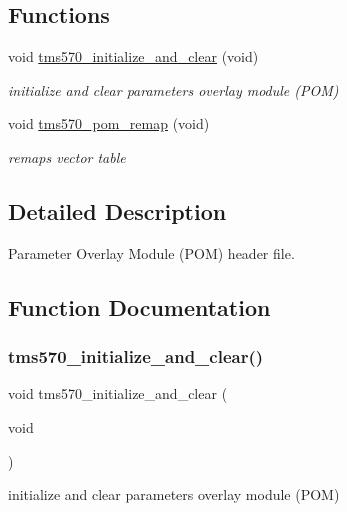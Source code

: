 \subsection*{Functions}
\begin{DoxyCompactItemize}
\item 
void \mbox{\hyperlink{tms570-pom_8h_a910d08b5bfffed83b88de9eb2ab27bc5}{tms570\+\_\+initialize\+\_\+and\+\_\+clear}} (void)
\begin{DoxyCompactList}\small\item\em initialize and clear parameters overlay module (P\+OM) \end{DoxyCompactList}\item 
void \mbox{\hyperlink{tms570-pom_8h_aa5484712012d1e84f9422450a76fd6d4}{tms570\+\_\+pom\+\_\+remap}} (void)
\begin{DoxyCompactList}\small\item\em remaps vector table \end{DoxyCompactList}\end{DoxyCompactItemize}


\subsection{Detailed Description}
Parameter Overlay Module (P\+OM) header file. 



\subsection{Function Documentation}
\mbox{\label{tms570-pom_8h_a910d08b5bfffed83b88de9eb2ab27bc5}} 
\subsubsection{\texorpdfstring{tms570\_initialize\_and\_clear()}{tms570\_initialize\_and\_clear()}}
{\footnotesize\ttfamily void tms570\+\_\+initialize\+\_\+and\+\_\+clear (\begin{DoxyParamCaption}\item[{void}]{ }\end{DoxyParamCaption})}



initialize and clear parameters overlay module (P\+OM) 

